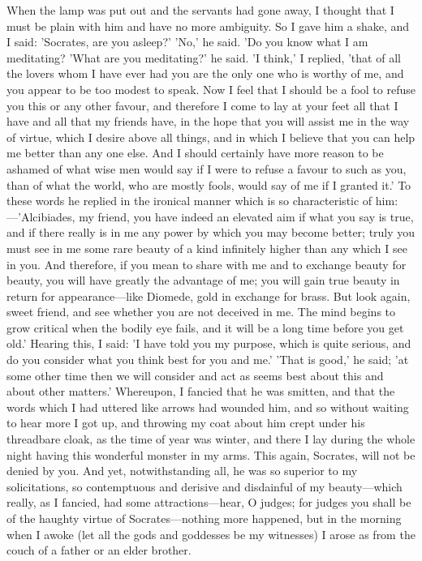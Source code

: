\documentclass[11pt,letter]{article}
\begin{document}
\par  When the lamp was put out and the servants had gone away, I thought that I must be plain with him and have no more ambiguity. So I gave him a shake, and I said: 'Socrates, are you asleep?' 'No,' he said. 'Do you know what I am meditating? 'What are you meditating?' he said. 'I think,' I replied, 'that of all the lovers whom I have ever had you are the only one who is worthy of me, and you appear to be too modest to speak. Now I feel that I should be a fool to refuse you this or any other favour, and therefore I come to lay at your feet all that I have and all that my friends have, in the hope that you will assist me in the way of virtue, which I desire above all things, and in which I believe that you can help me better than any one else. And I should certainly have more reason to be ashamed of what wise men would say if I were to refuse a favour to such as you, than of what the world, who are mostly fools, would say of me if I granted it.' To these words he replied in the ironical manner which is so characteristic of him:—'Alcibiades, my friend, you have indeed an elevated aim if what you say is true, and if there really is in me any power by which you may become better; truly you must see in me some rare beauty of a kind infinitely higher than any which I see in you. And therefore, if you mean to share with me and to exchange beauty for beauty, you will have greatly the advantage of me; you will gain true beauty in return for appearance—like Diomede, gold in exchange for brass. But look again, sweet friend, and see whether you are not deceived in me. The mind begins to grow critical when the bodily eye fails, and it will be a long time before you get old.' Hearing this, I said: 'I have told you my purpose, which is quite serious, and do you consider what you think best for you and me.' 'That is good,' he said; 'at some other time then we will consider and act as seems best about this and about other matters.' Whereupon, I fancied that he was smitten, and that the words which I had uttered like arrows had wounded him, and so without waiting to hear more I got up, and throwing my coat about him crept under his threadbare cloak, as the time of year was winter, and there I lay during the whole night having this wonderful monster in my arms. This again, Socrates, will not be denied by you. And yet, notwithstanding all, he was so superior to my solicitations, so contemptuous and derisive and disdainful of my beauty—which really, as I fancied, had some attractions—hear, O judges; for judges you shall be of the haughty virtue of Socrates—nothing more happened, but in the morning when I awoke (let all the gods and goddesses be my witnesses) I arose as from the couch of a father or an elder brother.
\end{document}
